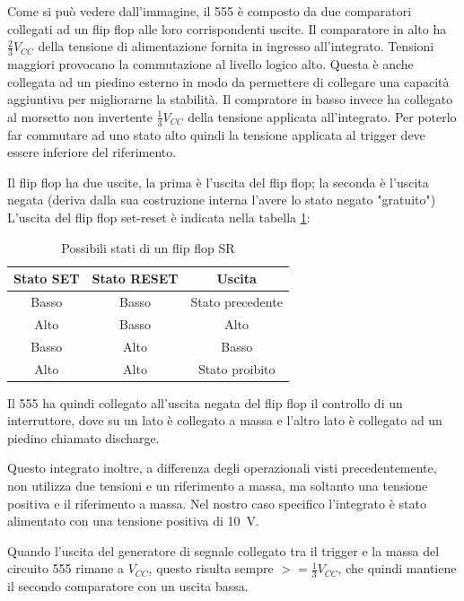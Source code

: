\noindent
Come si può vedere dall'immagine, il 555 è composto da due comparatori collegati ad un flip flop alle loro corrispondenti uscite. Il comparatore in alto ha $\frac{2}{3}V_{CC}$ della tensione di alimentazione fornita in ingresso all'integrato. Tensioni maggiori provocano la commutazione al livello logico alto. Questa è anche collegata ad un piedino esterno in modo da permettere di collegare una capacità aggiuntiva per migliorarne la stabilità. Il compratore in basso invece ha collegato al morsetto non invertente $\frac{1}{3}V_{CC}$ della tensione applicata all'integrato. Per poterlo far commutare ad uno stato alto quindi la tensione applicata al trigger deve essere inferiore del riferimento.

Il flip flop ha due uscite, la prima è l'uscita del flip flop; la seconda è l'uscita negata (deriva dalla sua costruzione interna l'avere lo stato negato "gratuito")
L'uscita del flip flop set-reset è indicata nella tabella \ref{tab:flip_flop_states}:

\def\arraystretch{1.3}
\begin{table}[h!]
	\centering
	\begin{tabular}{|c|c|c|}
		\hline
		Stato SET	& Stato RESET & Uscita \\ \hline
		Basso & Basso & Stato precedente  \\ \hline
		Alto & Basso & Alto\\ \hline
		Basso & Alto & Basso\\ \hline
		Alto & Alto & Stato proibito \\ \hline
	\end{tabular}
	\caption{Possibili stati di un flip flop SR}
	\label{tab:flip_flop_states}
\end{table}

Il 555 ha quindi collegato all'uscita negata del flip flop il controllo di un interruttore, dove su un lato è collegato a massa e l'altro lato è collegato ad un piedino chiamato discharge.

\noindent
Questo integrato inoltre, a differenza degli operazionali visti precedentemente, non utilizza due tensioni e un riferimento a massa, ma soltanto una tensione positiva e il riferimento a massa. Nel nostro caso specifico l'integrato è stato alimentato con una tensione positiva di \SI{10}{\volt}.

\noindent
Quando l'uscita del generatore di segnale collegato tra il trigger e la massa del circuito 555 rimane a $V_{CC}$, questo risulta sempre $>=\frac{1}{3}V_{CC}$, che quindi mantiene il secondo comparatore con un uscita bassa.

